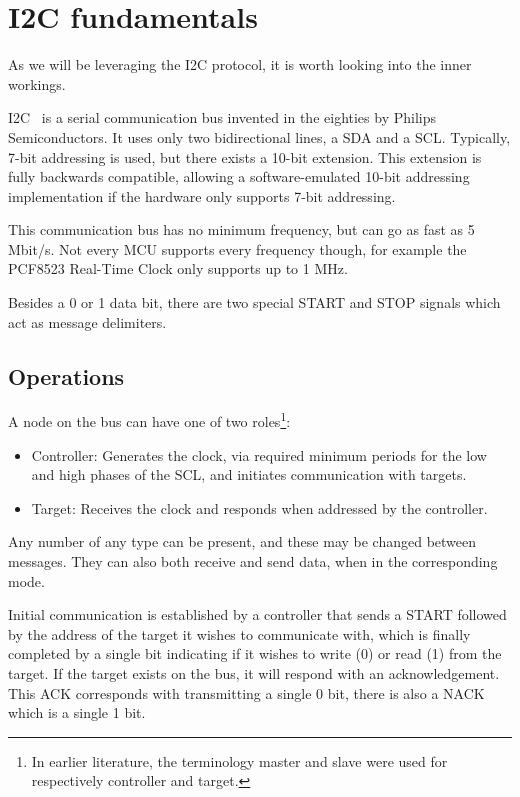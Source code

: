 \chapter{I2C fundamentals}
\label{chap:i2c}

As we will be leveraging the \gls{I2C} protocol, it is worth looking into the inner workings. 

\gls{I2C}~\cite{nxp:i2c} is a serial communication bus invented in the eighties by Philips Semiconductors. It uses only two bidirectional lines, a \gls{SDA} and a \gls{SCL}. Typically, 7-bit addressing is used, but there exists a 10-bit extension. This extension is fully backwards compatible, allowing a software-emulated 10-bit addressing implementation if the hardware only supports 7-bit addressing.

This communication bus has no minimum frequency, but can go as fast as 5 Mbit/s. Not every \gls{MCU} supports every frequency though, for example the PCF8523 Real-Time Clock only supports up to 1 MHz.

Besides a 0 or 1 data bit, there are two special START and STOP signals which act as message delimiters.

\section{Operations}

A node on the bus can have one of two roles\footnote{In earlier literature, the terminology master and slave were used for respectively controller and target.}:
\begin{itemize}
    \item Controller: Generates the clock, via required minimum periods for the low and high phases of the \gls{SCL}, and initiates communication with targets.
    \item Target: Receives the clock and responds when addressed by the controller.
\end{itemize}
Any number of any type can be present, and these may be changed between messages. They can also both receive and send data, when in the corresponding mode.

Initial communication is established by a controller that sends a START followed by the address of the target it wishes to communicate with, which is finally completed by a single bit indicating if it wishes to write (0) or read (1) from the target. If the target exists on the bus, it will respond with an acknowledgement. This \gls{ACK} corresponds with transmitting a single 0 bit, there is also a \gls{NACK} which is a single 1 bit.

